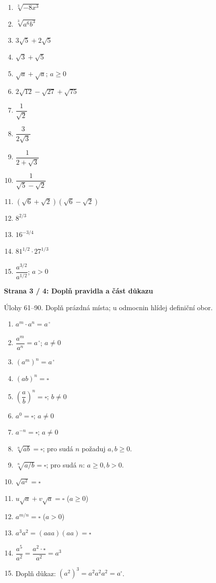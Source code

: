 \documentclass[11pt,a4paper]{article}
\newcommand{\studenthead}[2]{%
  {\large\bfseries #1}\par\vspace{1mm}
  {\footnotesize #2}\par\vspace{2.4mm}}
\begin{document}
\begin{minipage}[t]{.49\textwidth}
\begin{enumerate}[label=\textbf{\arabic*.},leftmargin=8mm,itemsep=11pt,topsep=3pt,start=46]
\normalsize
\item $\sqrt[3]{-8x^3}$
\item $\sqrt[3]{a^6b^3}$
\item $3\sqrt5+2\sqrt5$
\item $\sqrt3+\sqrt5$
\item $\sqrt a+\sqrt a$; $a\ge0$
\item $2\sqrt{12}-\sqrt{27}+\sqrt{75}$
\item $\dfrac1{\sqrt2}$
\item $\dfrac3{2\sqrt3}$
\item $\dfrac1{2+\sqrt3}$
\item $\dfrac1{\sqrt5-\sqrt2}$
\item $(\sqrt6+\sqrt2)(\sqrt6-\sqrt2)$
\item $8^{2/3}$
\item $16^{-3/4}$
\item $81^{1/2}\cdot27^{1/3}$
\item $\dfrac{a^{3/2}}{a^{1/2}}$; $a>0$
\end{enumerate}
\end{minipage}
\clearpage
\studenthead{Strana 3 / 4: Doplň pravidla a část důkazu}{Úlohy 61--90. Doplň prázdná místa; u odmocnin hlídej definiční obor.}
\noindent\begin{minipage}[t]{.49\textwidth}
\begin{enumerate}[label=\textbf{\arabic*.},leftmargin=8mm,itemsep=11pt,topsep=3pt,start=61]
\normalsize
\item $a^m\cdot a^n=a^{\,\square}$
\item $\dfrac{a^m}{a^n}=a^{\,\square}$; $a\ne0$
\item $(a^m)^n=a^{\,\square}$
\item $(ab)^n=\square$
\item $\left(\dfrac ab\right)^n=\square$; $b\ne0$
\item $a^0=\square$; $a\ne0$
\item $a^{-n}=\square$; $a\ne0$
\item $\sqrt[n]{ab}=\square$; pro sudá $n$ požaduj $a,b\ge0$.
\item $\sqrt[n]{a/b}=\square$; pro sudá $n$: $a\ge0,b>0$.
\item $\sqrt{a^2}=\square$
\item $u\sqrt a+v\sqrt a=\square$ ($a\ge0$)
\item $a^{m/n}=\square$ ($a>0$)
\item $a^3a^2=(aaa)(aa)=\square$
\item $\dfrac{a^5}{a^2}=\dfrac{a^2\cdot\square}{a^2}=a^3$
\item Doplň důkaz: $(a^2)^3=a^2a^2a^2=a^{\square}$.
\end{enumerate}
\end{minipage}\hfill
\end{document}
